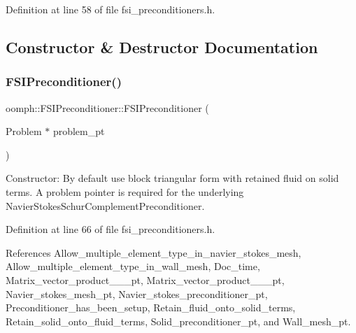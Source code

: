 Definition at line 58 of file fsi\+\_\+preconditioners.\+h.



\subsection{Constructor \& Destructor Documentation}
\mbox{\label{classoomph_1_1FSIPreconditioner_aee06474cc9aabbde2dacb2cff1317a78}} 
\subsubsection{\texorpdfstring{F\+S\+I\+Preconditioner()}{FSIPreconditioner()}\hspace{0.1cm}{\footnotesize\ttfamily [1/2]}}
{\footnotesize\ttfamily oomph\+::\+F\+S\+I\+Preconditioner\+::\+F\+S\+I\+Preconditioner (\begin{DoxyParamCaption}\item[{Problem $\ast$}]{problem\+\_\+pt }\end{DoxyParamCaption})\hspace{0.3cm}{\ttfamily [inline]}}



Constructor\+: By default use block triangular form with retained fluid on solid terms. A problem pointer is required for the underlying Navier\+Stokes\+Schur\+Complement\+Preconditioner. 



Definition at line 66 of file fsi\+\_\+preconditioners.\+h.



References Allow\+\_\+multiple\+\_\+element\+\_\+type\+\_\+in\+\_\+navier\+\_\+stokes\+\_\+mesh, Allow\+\_\+multiple\+\_\+element\+\_\+type\+\_\+in\+\_\+wall\+\_\+mesh, Doc\+\_\+time, Matrix\+\_\+vector\+\_\+product\+\_\+\_\+\_\+pt, Matrix\+\_\+vector\+\_\+product\+\_\+\_\+\_\+pt, Navier\+\_\+stokes\+\_\+mesh\+\_\+pt, Navier\+\_\+stokes\+\_\+preconditioner\+\_\+pt, Preconditioner\+\_\+has\+\_\+been\+\_\+setup, Retain\+\_\+fluid\+\_\+onto\+\_\+solid\+\_\+terms, Retain\+\_\+solid\+\_\+onto\+\_\+fluid\+\_\+terms, Solid\+\_\+preconditioner\+\_\+pt, and Wall\+\_\+mesh\+\_\+pt.

